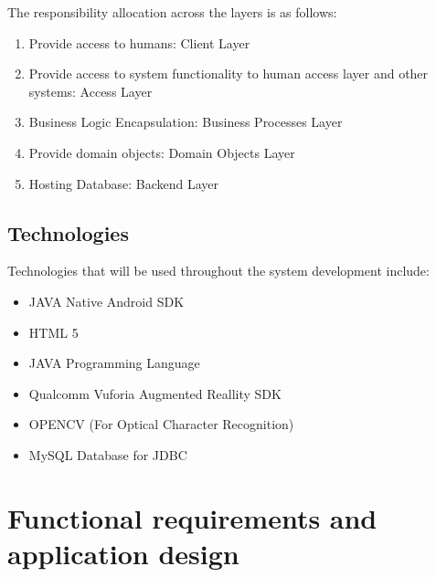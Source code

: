 \documentclass[12pt]{article}
\begin{document}
                			
                			The responsibility allocation across the layers is as follows:
                			\begin{enumerate}
                					\item Provide access to humans: Client Layer
                					\item Provide access to system functionality to human access layer and other systems: Access Layer
                					\item Business Logic Encapsulation: Business Processes Layer
                					\item Provide domain objects: Domain Objects Layer
                					\item Hosting Database: Backend Layer
                			\end{enumerate}
                			
					\subsection{Technologies}
							Technologies that will be used throughout the system development include:
							\begin{itemize}
								\item JAVA Native Android SDK
								\item HTML 5
								\item JAVA Programming Language
								\item Qualcomm Vuforia Augmented Reallity SDK
								\item OPENCV (For Optical Character Recognition)
								\item MySQL Database for JDBC
							\end{itemize}
                    
                \section{Functional requirements and application design}
\end{document}
